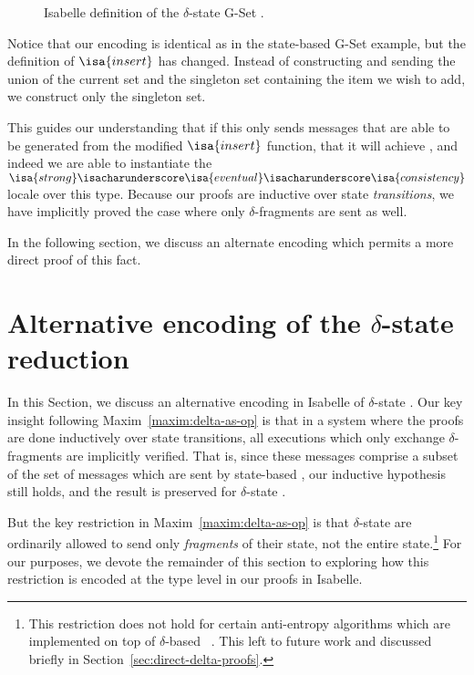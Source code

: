 \begin{figure}[H]
  
  \caption{Isabelle definition of the $\delta$-state G-Set \CRDT.}
\end{figure}

Notice that our encoding is identical as in the state-based G-Set example, but
the definition of $\isa{insert}$ has changed. Instead of constructing and
sending the union of the current set and the singleton set containing the item
we wish to add, we construct only the singleton set.

This guides our understanding that if this \CRDT only sends messages that are
able to be generated from the modified $\isa{insert}$ function, that it will
achieve \SEC, and indeed we are able to instantiate the
$\isa{strong}\isacharunderscore\isa{eventual}\isacharunderscore\isa{consistency}$
locale over this type. Because our proofs are inductive over state
\emph{transitions}, we have implicitly proved the case where only
$\delta$-fragments are sent as well.

In the following section, we discuss an alternate encoding which permits a more
direct proof of this fact.

\section{Alternative encoding of the $\delta$-state reduction}
\label{sec:alternate-delta-encoding}

In this Section, we discuss an alternative encoding in Isabelle of
$\delta$-state \CRDTs. Our key insight following
Maxim~\ref{maxim:delta-as-op} is that in a system where the proofs are done
inductively over state transitions, all executions which only exchange
$\delta$-fragments are implicitly verified. That is, since these messages
comprise a subset of the set of messages which are sent by state-based \CRDTs,
our inductive hypothesis still holds, and the result is preserved for
$\delta$-state \CRDTs.

But the key restriction in Maxim~\ref{maxim:delta-as-op} is that
$\delta$-state \CRDTs are ordinarily allowed to send only \emph{fragments} of
their state, not the entire state.\footnote{This restriction does not hold for
certain anti-entropy algorithms which are implemented on top of $\delta$-based
\CRDTs~\citep{almedia18}. This left to future work and discussed briefly in
Section~\ref{sec:direct-delta-proofs}.} For our purposes, we devote the
remainder of this section to exploring how this restriction is encoded at the
type level in our proofs in Isabelle.

